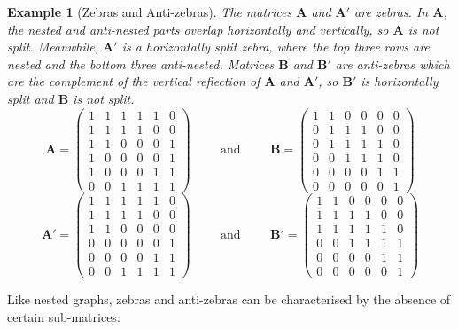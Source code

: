 \documentclass{article}
\newtheorem{example}{Example}
\newcommand{\A}{\mathbf A}
\begin{document}
\begin{example}[Zebras and Anti-zebras]\label{ex:Z&A}
The matrices $\A$ and $\A'$ are zebras. In $\A$, the nested and anti-nested parts overlap horizontally and vertically, so $\A$ is not split. Meanwhile, $\A'$ is a horizontally split zebra, where the top three rows are nested and the bottom three anti-nested. Matrices $\mathbf B$ and $\mathbf B'$ are anti-zebras which are the complement of the vertical reflection of $\A$ and $\A'$, so $\mathbf B'$ is horizontally split and $\mathbf B$ is not split.
$$\A=\begin{pmatrix}
1&1&1&1&1&0\\
1&1&1&1&0&0\\
1&1&0&0&0&1\\
1&0&0&0&0&1\\
1&0&0&0&1&1\\
0&0&1&1&1&1
\end{pmatrix}
\hspace{1cm} \text{and} \hspace{1cm} \mathbf{B}=\begin{pmatrix}
1&1&0&0&0&0\\
0&1&1&1&0&0\\
0&1&1&1&1&0\\
0&0&1&1&1&0\\
0&0&0&0&1&1\\
0&0&0&0&0&1
\end{pmatrix}$$
$$\A'=\begin{pmatrix}
1&1&1&1&1&0\\
1&1&1&1&0&0\\
1&1&0&0&0&0\\
0&0&0&0&0&1\\
0&0&0&0&1&1\\
0&0&1&1&1&1
\end{pmatrix}
\hspace{1cm} \text{and} \hspace{1cm} \mathbf{B}'=\begin{pmatrix}
1&1&0&0&0&0\\
1&1&1&1&0&0\\
1&1&1&1&1&0\\
0&0&1&1&1&1\\
0&0&0&0&1&1\\
0&0&0&0&0&1
\end{pmatrix}$$
\end{example}

Like nested graphs, zebras and anti-zebras can be characterised by the absence of certain sub-matrices:
\end{document}
